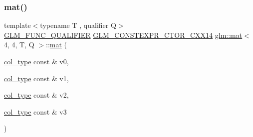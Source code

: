\mbox{\label{structglm_1_1mat_3_014_00_014_00_01_t_00_01_q_01_4_aa7b2bf3c5fa3249c5aa383c60c1ae853}} 
\subsubsection{\texorpdfstring{mat()}{mat()}\hspace{0.1cm}{\footnotesize\ttfamily [6/21]}}
{\footnotesize\ttfamily template$<$typename T , qualifier Q$>$ \\
\hyperlink{setup_8hpp_a33fdea6f91c5f834105f7415e2a64407}{G\+L\+M\+\_\+\+F\+U\+N\+C\+\_\+\+Q\+U\+A\+L\+I\+F\+I\+ER} \hyperlink{setup_8hpp_a0900f9145e68bf6061b6f5e7be3fa751}{G\+L\+M\+\_\+\+C\+O\+N\+S\+T\+E\+X\+P\+R\+\_\+\+C\+T\+O\+R\+\_\+\+C\+X\+X14} \hyperlink{structglm_1_1mat}{glm\+::mat}$<$ 4, 4, T, Q $>$\+::\hyperlink{structglm_1_1mat}{mat} (\begin{DoxyParamCaption}\item[{\hyperlink{structglm_1_1mat_3_014_00_014_00_01_t_00_01_q_01_4_aad430dc291d0156d573c434be7fdecc1}{col\+\_\+type} const \&}]{v0,  }\item[{\hyperlink{structglm_1_1mat_3_014_00_014_00_01_t_00_01_q_01_4_aad430dc291d0156d573c434be7fdecc1}{col\+\_\+type} const \&}]{v1,  }\item[{\hyperlink{structglm_1_1mat_3_014_00_014_00_01_t_00_01_q_01_4_aad430dc291d0156d573c434be7fdecc1}{col\+\_\+type} const \&}]{v2,  }\item[{\hyperlink{structglm_1_1mat_3_014_00_014_00_01_t_00_01_q_01_4_aad430dc291d0156d573c434be7fdecc1}{col\+\_\+type} const \&}]{v3 }\end{DoxyParamCaption})}

\mbox{\label{structglm_1_1mat_3_014_00_014_00_01_t_00_01_q_01_4_a17ec7d9bde054dde9908c44c56eccf95}} 
